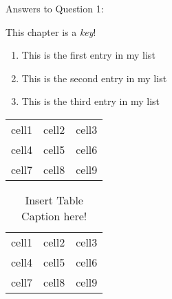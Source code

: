 Answers to Question 1:

This chapter is a \emph{key}!

\begin{enumerate}
  \item This is the first entry in my list
  \item This is the second entry in my list
  \item This is the third entry in my list
\end{enumerate}

\begin{center}
    \begin{tabular}{ c c c }
        cell1 & cell2 & cell3 \\ 
        cell4 & cell5 & cell6 \\  
        cell7 & cell8 & cell9    
    \end{tabular}
\end{center}

\begin{table}[h]
\centering
    \begin{tabular}{ |c| c| c| }
     \hline
        cell1 & cell2 & cell3 \\ 
        cell4 & cell5 & cell6 \\  
        cell7 & cell8 & cell9 \\  
     \hline
    \end{tabular}\\
    \caption{Insert Table Caption here!}
    \label{table:1}
\end{table}